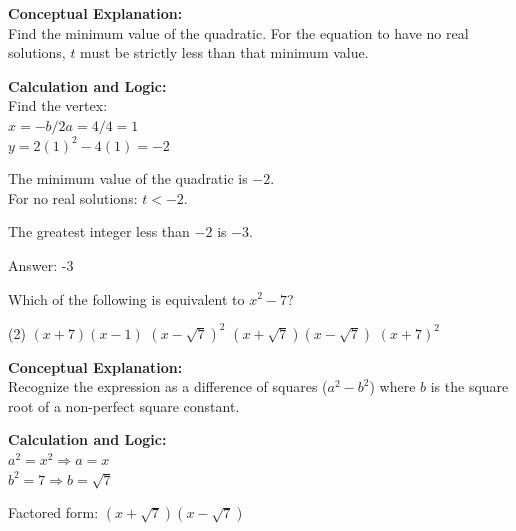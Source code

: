 \documentclass[11pt,paper=a4,answers]{exam}
\begin{document}
\begin{questions}
\begin{solution}
\textbf{Conceptual Explanation:} \\
Find the minimum value of the quadratic. For the equation to have no real solutions, $t$ must be strictly less than that minimum value.

\vspace{20pt}

\textbf{Calculation and Logic:} \\
Find the vertex: \\
$x = -b/2a = 4/4 = 1$ \\
$y = 2(1)^2 - 4(1) = -2$

\vspace{10pt}

The minimum value of the quadratic is $-2$. \\
For no real solutions: $t < -2$.

\vspace{10pt}

The greatest integer less than $-2$ is $-3$.

\vspace{25pt}

Answer: \colorbox{yellow!100}{-3}
\end{solution}

\vspace{40pt}

\question
Which of the following is equivalent to $x^2 - 7$?
\begin{tasks}(2)
    \task $(x + 7)(x - 1)$
    \task $(x - \sqrt{7})^2$
    \task $(x + \sqrt{7})(x - \sqrt{7})$
    \task $(x + 7)^2$
\end{tasks}

\begin{solution}
\textbf{Conceptual Explanation:} \\
Recognize the expression as a difference of squares ($a^2 - b^2$) where $b$ is the square root of a non-perfect square constant.

\vspace{20pt}

\textbf{Calculation and Logic:} \\
$a^2 = x^2 \Rightarrow a = x$ \\
$b^2 = 7 \Rightarrow b = \sqrt{7}$

\vspace{10pt}

Factored form: $(x + \sqrt{7})(x - \sqrt{7})$


\end{solution}
\end{questions}
\end{document}
